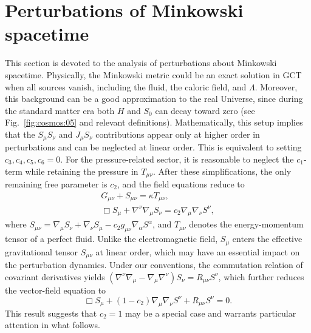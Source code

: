 \documentclass[aps,prd,twocolumn]{revtex4-2}
\begin{document}
\section{Perturbations of Minkowski spacetime}\label{sec:IV}
This section is devoted to the analysis of perturbations about Minkowski spacetime. Physically, the Minkowski metric could be an exact solution in GCT when all sources vanish, including the fluid, the caloric field, and $\Lambda$. Moreover, this background can be a good approximation to the real Universe, since during the standard matter era both $H$ and $S_0$ can decay toward zero (see Fig.~\ref{fig:cosmos:05} and relevant definitions). Mathematically, this setup implies that the $S_\mu S_\nu$ and $J_\mu S_\nu$ contributions appear only at higher order in perturbations and can be neglected at linear order. This is equivalent to setting $c_3,c_4,c_5,c_6=0$. For the pressure-related sector, it is reasonable to neglect the $c_1$-term while retaining the pressure in $T_{\mu\nu}$. After these simplifications, the only remaining free parameter is $c_2$, and the field equations reduce to 
\begin{subequations}
\begin{gather}
  G_{\mu\nu} + S_{\mu\nu} = \kappa T_{\mu\nu}, \label{eq:4.1a}\\
  \Box S_\mu + \nabla^\nu\nabla_\mu S_\nu = c_2 \nabla_\mu\nabla_\nu S^\nu,
\end{gather}
\end{subequations}
where $S_{\mu\nu} = \nabla_\mu S_\nu + \nabla_\nu S_\mu - c_2 g_{\mu\nu} \nabla_\alpha S^\alpha$, and $T_{\mu\nu}$ denotes the energy-momentum tensor of a perfect fluid. Unlike the electromagnetic field, $S_\mu$ enters the effective gravitational tensor $S_{\mu\nu}$ at linear order, which may have an essential impact on the perturbation dynamics. Under our conventions, the commutation relation of covariant derivatives yields $(\nabla^\nu\nabla_\mu-\nabla_\mu\nabla^\nu)S_\nu = R_{\mu\nu}S^\nu$, which further reduces the vector-field equation to
\begin{equation}\label{eq:4.2}
  \Box S_\mu + (1-c_2) \nabla_\mu\nabla_\nu S^\nu + R_{\mu\nu}S^\nu = 0.
\end{equation}
This result suggests that $c_2=1$ may be a special case and warrants particular attention in what follows.
\end{document}
